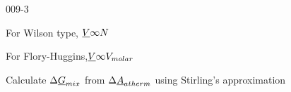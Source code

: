 \begin{mitframe}{009-3}
\begin{listone}
\begin{listtwo}
\begin{listthree}
        	\item For Wilson type, $\uline{\vol}\infty\nummoles$
        
        	\item For Flory-Huggins,$\uline{\vol}\infty\vol_{molar}$

		\end{listthree}
         
    \end{listtwo}
    
    \item Calculate $\iipf\uline{\gibbs}_{\mixfunc}$ from $\iipf\uline{\helmholtz}_{\atfunc}$ using Stirling's approximation
    
    \begin{listtwo}
    	
        \item 
    
    \end{listtwo}
    
\end{listone}			

\end{mitframe}